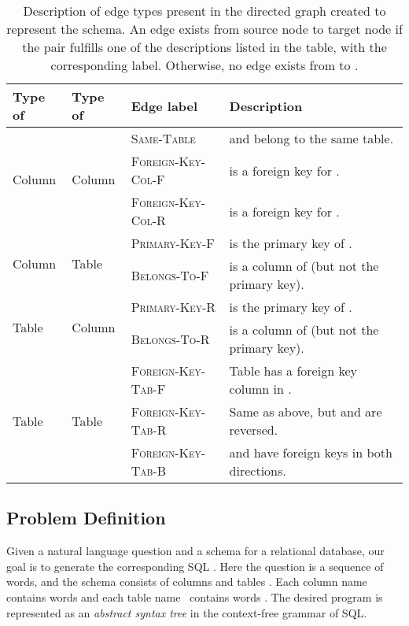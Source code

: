 \documentclass[11pt,a4paper,final]{article}
\begin{document}
\begin{table*}[t]
    \centering
    \begin{tabular}{lllp{7cm}}
        \toprule
        Type of  & Type of  & Edge label & Description \\
        \midrule
        \multirow{3}{*}{Column} & \multirow{3}{*}{Column}
   & \textsc{Same-Table}    &  and  belong to the same table. \\
 & & \textsc{Foreign-Key-Col-F} &  is a foreign key for . \\
 & & \textsc{Foreign-Key-Col-R} &  is a foreign key for . \\
 \midrule
 \multirow{2}{*}{Column} & \multirow{2}{*}{Table}
   & \textsc{Primary-Key-F}   &  is the primary key of . \\
 & & \textsc{Belongs-To-F}    &  is a column of  (but not the primary key). \\
 \midrule
 \multirow{2}{*}{Table} & \multirow{2}{*}{Column}
   & \textsc{Primary-Key-R}   &  is the primary key of . \\
 & & \textsc{Belongs-To-R}    &  is a column of  (but not the primary key). \\
 \midrule
 \multirow{3}{*}{Table} & \multirow{3}{*}{Table}
   & \textsc{Foreign-Key-Tab-F}   & Table  has a foreign key column in . \\
 & & \textsc{Foreign-Key-Tab-R}   & Same as above, but  and  are reversed. \\
 & & \textsc{Foreign-Key-Tab-B}   &  and  have foreign keys in both directions. \\
 \bottomrule
\end{tabular}
\caption{Description of edge types present in the directed graph  created to represent the schema.
    An edge exists from source node  to target node  if the pair fulfills one of the
    descriptions listed in the table, with the corresponding label.
Otherwise, no edge exists from  to .}
\label{table:schema-graph-edges}
\vspace{-1\baselineskip}
\end{table*}

\subsection{Problem Definition}
Given a natural language question  and a schema  for a
relational database, our goal is to generate the corresponding SQL .
Here the question  is a sequence of words,
and the schema consists of columns 
and tables .
Each column name~ contains words  and
each table name~ contains words .
The desired program  is represented as an \emph{abstract syntax tree}  in the context-free grammar of SQL.
\end{document}
